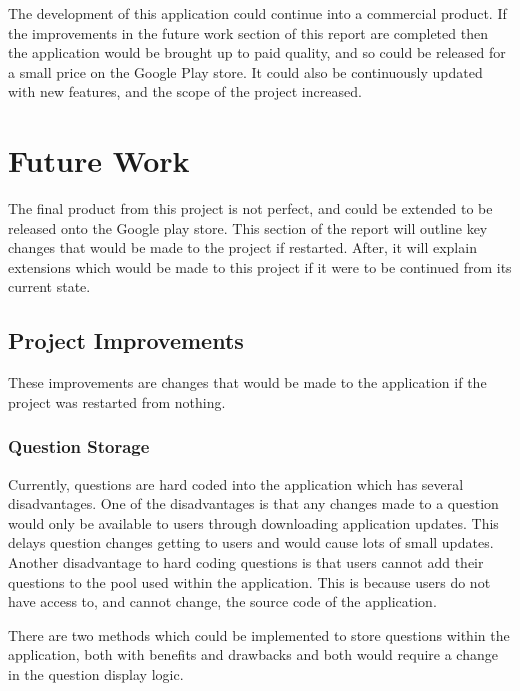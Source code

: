 \documentclass{article}
\begin{document}
The development of this application could continue into a commercial product. If the improvements in the future work section of this report are completed then the application would be brought up to paid quality, and so could be released for a small price on the Google Play store. It could also be continuously updated with new features, and the scope of the project increased. \par

\section{Future Work}
\label{section:futureWork}

The final product from this project is not perfect, and could be extended to be released onto the Google play store. This section of the report will outline key changes that would be made to the project if restarted. After, it will explain extensions which would be made to this project if it were to be continued from its current state. \par

\subsection{Project Improvements}

These improvements are changes that would be made to the application if the project was restarted from nothing.

\subsubsection{Question Storage}

Currently, questions are hard coded into the application which has several disadvantages. One of the disadvantages is that any changes made to a question would only be available to users through downloading application updates. This delays question changes getting to users and would cause lots of small updates. Another disadvantage to hard coding questions is that users cannot add their questions to the pool used within the application. This is because users do not have access to, and cannot change, the source code of the application. \par

There are two methods which could be implemented to store questions within the application, both with benefits and drawbacks and both would require a change in the question display logic. \par
\end{document}
